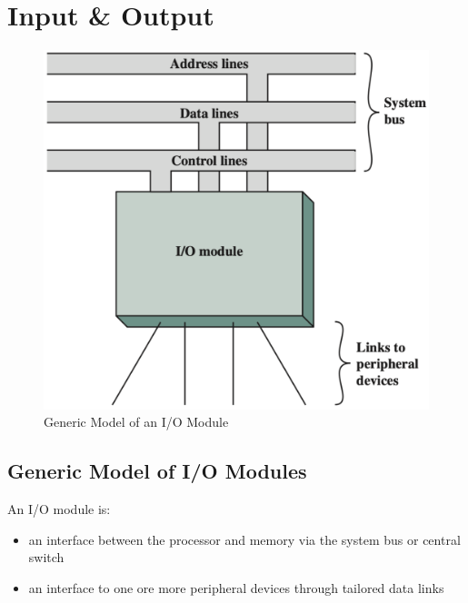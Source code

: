 \section{Input \& Output}

\begin{multicols}{2}

\begin{figure}[H]
    \centering
    \includegraphics[width=\linewidth]{chaps/input-output/io-module-model.png}
    \caption{Generic Model of an I/O Module}
\end{figure}

\columnbreak

\subsection{Generic Model of I/O Modules}

An I/O module is:
\begin{itemize}
    \item an interface between the processor and memory via the system bus or central switch
    \item an interface to one ore more peripheral devices through tailored data links
\end{itemize}


\end{multicols}
